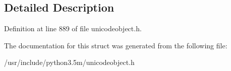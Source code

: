\subsection{Detailed Description}


Definition at line 889 of file unicodeobject.\+h.



The documentation for this struct was generated from the following file\+:\begin{DoxyCompactItemize}
\item 
/usr/include/python3.\+5m/unicodeobject.\+h\end{DoxyCompactItemize}
